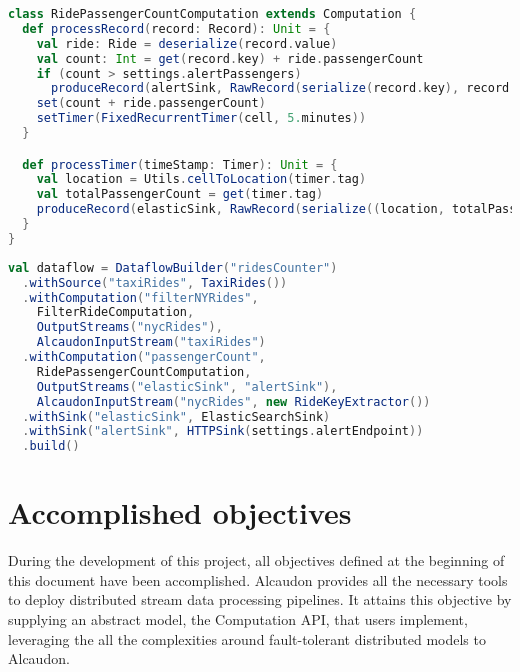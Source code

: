 \begin{lstlisting}[language=scala, frame=trBL, label=code:computationRide, float=ht, caption = {Ride \acs{ADT}}]
class RidePassengerCountComputation extends Computation {
  def processRecord(record: Record): Unit = {
    val ride: Ride = deserialize(record.value)
    val count: Int = get(record.key) + ride.passengerCount
    if (count > settings.alertPassengers)
      produceRecord(alertSink, RawRecord(serialize(record.key), record.timestamp))
    set(count + ride.passengerCount)
    setTimer(FixedRecurrentTimer(cell, 5.minutes))
  }

  def processTimer(timeStamp: Timer): Unit = {
    val location = Utils.cellToLocation(timer.tag)
    val totalPassengerCount = get(timer.tag)
    produceRecord(elasticSink, RawRecord(serialize((location, totalPassengerCount)), record.timestamp))
  }
}
\end{lstlisting}

\begin{lstlisting}[language=scala, frame=trBL, label=code:rideDataflow, float=ht, caption = {Ride dataflow creation}]
val dataflow = DataflowBuilder("ridesCounter")
  .withSource("taxiRides", TaxiRides())
  .withComputation("filterNYRides",
    FilterRideComputation,
    OutputStreams("nycRides"),
    AlcaudonInputStream("taxiRides")
  .withComputation("passengerCount",
    RidePassengerCountComputation,
    OutputStreams("elasticSink", "alertSink"),
    AlcaudonInputStream("nycRides", new RideKeyExtractor())
  .withSink("elasticSink", ElasticSearchSink)
  .withSink("alertSink", HTTPSink(settings.alertEndpoint))
  .build()
\end{lstlisting}

\section{Accomplished objectives}

During the development of this project, all objectives defined at the beginning
of this document have been accomplished. Alcaudon provides all the necessary
tools to deploy distributed stream data processing pipelines. It attains this
objective by supplying an abstract model, the Computation \acs{API}, that users
implement, leveraging the all the complexities around fault-tolerant distributed
models to Alcaudon.

